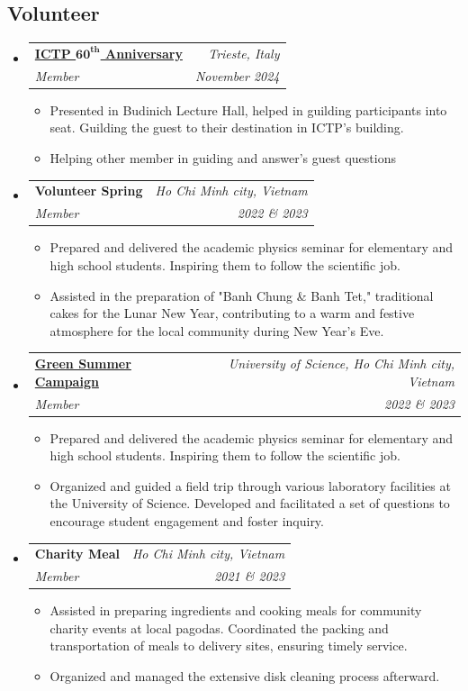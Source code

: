 \documentclass[letterpaper,11pt]{article}
\makeatletter
\newcommand{\resumeOrganizationHeading}[4]{
	\vspace{-2pt}\item
	\begin{tabular*}{0.97\textwidth}[t]{l@{\extracolsep{\fill}}r}
		\textbf{#1} & \textit{\small #2} \\
		\textit{\small#3} & \textit{\small #4} 
	\end{tabular*}\vspace{-7pt}
}
\newcommand{\resumeSubHeadingListStart}{\begin{itemize}[leftmargin=0.15in, label={}]}
\newcommand{\resumeSubHeadingListEnd}{\end{itemize}}
\newcommand{\resumeItemListStart}{\begin{itemize}}
\newcommand{\resumeItemListEnd}{\end{itemize}\vspace{-5pt}}
\makeatother
\begin{document}
\subsection*{Volunteer}
\resumeSubHeadingListStart
\resumeOrganizationHeading{\href{https://ilpiccolo.gelocal.it/trieste/cronaca/2024/11/15/news/ictp_trieste_60_anni_scienza-14808715/}{ICTP \(\textbf{60}^{\textbf{th}}\) Anniversary\faLink}}{Trieste, Italy}{Member}{November 2024}
\resumeItemListStart
\item{Presented in Budinich Lecture Hall, helped in guilding participants into seat. Guilding the guest to their destination in ICTP's building.}
\item{Helping other member in guiding and answer's guest questions}
\resumeItemListEnd
\resumeOrganizationHeading{Volunteer Spring}{Ho Chi Minh city, Vietnam}{Member}{2022 \& 2023}
\resumeItemListStart
\item{Prepared and delivered the academic physics seminar for elementary and high school students. Inspiring them to follow the scientific job.}
\item{Assisted in the preparation of "Banh Chung \& Banh Tet," traditional cakes for the Lunar New Year, contributing to a warm and festive atmosphere for the local community during New Year's Eve.}
\resumeItemListEnd
\resumeOrganizationHeading{\href{https://fb.watch/wZd1tcJeh3?t=860
}{Green Summer Campaign\faLink}}{University of Science, Ho Chi Minh city, Vietnam}{Member}{2022 \& 2023}
\resumeItemListStart
\item{Prepared and delivered the academic physics seminar for elementary and high school students. Inspiring them to follow the scientific job.}
\item{Organized and guided a field trip through various laboratory facilities at the University of Science. Developed and facilitated a set of questions to encourage student engagement and foster inquiry.}
\resumeItemListEnd
\resumeOrganizationHeading{Charity Meal}{Ho Chi Minh city, Vietnam}{Member}{2021 \& 2023}
\resumeItemListStart
\item{Assisted in preparing ingredients and cooking meals for community charity events at local pagodas. Coordinated the packing and transportation of meals to delivery sites, ensuring timely service.}
\item{Organized and managed the extensive disk cleaning process afterward.}
\resumeItemListEnd
\resumeSubHeadingListEnd
\end{document}
